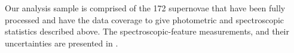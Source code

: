 \documentclass[trackchanges]{aastex61}   	%
\begin{document}
Our analysis sample is comprised of the
172
supernovae that have been fully processed and have the data coverage to 
give photometric and spectroscopic statistics described above.
The 
spectroscopic-feature measurements, 
and their uncertainties
are presented
in \citet{2017Chotard}.
%
%
%
\end{document}
